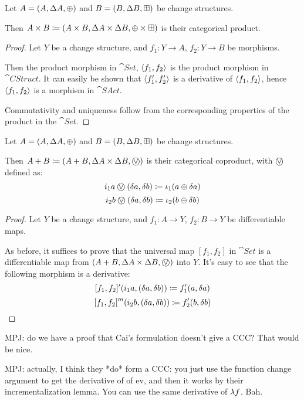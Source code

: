 \begin{prop}[Products]
  Let $A = (A,\Delta A,\oplus)$ and $B =
  (B,\Delta B,\boxplus)$ be change structures.

  Then $A \times B \coloneqq (A \times B,\Delta A \times
  \Delta B,\oplus \times \boxplus)$ is their categorical product.
\end{prop}
\begin{proof}
  Let $Y$ be a change structure, and $f_1: Y \rightarrow A$, $f_2: Y
  \rightarrow B$ be morphisms.

  Then the product morphism in $\cat{Set}$, $\left\langle {f_1}, {f_2} \right\rangle$ is the product
  morphism in $\cat{CStruct}$. It can easily be
  shown that $\left\langle {f_1'}, {f_2'} \right\rangle$ is a derivative of $\left\langle {f_1}, {f_2} \right\rangle$,
  hence $\left\langle {f_1}, {f_2} \right\rangle$ is a morphism in $\cat{SAct}$.

  Commutativity and uniqueness follow from the corresponding properties of the
  product in the $\cat{Set}$.
\end{proof}

\begin{prop}[Coproducts]
  Let $A = (A,\Delta A,\oplus)$ and $B =
  (B,\Delta B,\boxplus)$ be change structures.

  Then $A + B \defeq \cstruct{A + B}{\changes{A} \times
  \changes{B}}{\cplusvee}$ is their categorical coproduct, with $\cplusvee$ defined as:
  $$i_1 a \cplusvee (\change{a}, \change{b}) \defeq \iota_1 (a \cplus \change{a})$$
  $$i_2 b \cplusvee (\change{a}, \change{b}) \defeq \iota_2 (b \cplus \change{b})$$
\end{prop}
\begin{proof}
  Let $Y$ be a change structure, and $f_1 : A \rightarrow Y$, $f_2 : B
  \rightarrow Y$ be differentiable maps.

  As before, it suffices to prove that the universal map $[f_1, f_2]$ in $\cat{Set}$ is a differentiable
  map from $\cstruct{A + B}{\changes{A} \times \changes{B}}{\cplusvee}$ into $Y$. It's easy to see 
  that the following morphism is a derivative:
  $$[f_1, f_2]' (i_1 a, (\delta a, \delta b)) \coloneqq f_1'(a, \delta a)$$
  $$[f_1, f_2]''' (i_2 b, (\delta a, \delta b)) \coloneqq f_2'(b, \delta b)$$
\end{proof}

MPJ: do we have a proof that Cai's formulation doesn't give a CCC? That would be
nice.

MPJ: actually, I think they *do* form a CCC: you just use the function change
argument to get the derivative of of ev, and then it works by their
incrementalization lemma. You can use the same derivative of $\lambda f$. Bah.

